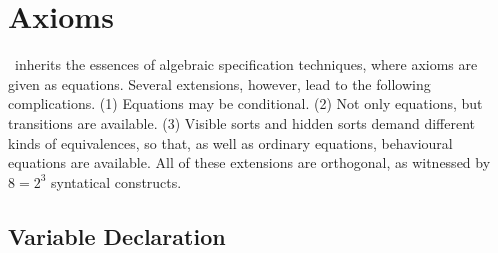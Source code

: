 \documentclass[a4paper]{memoir}
\begin{document}

\chapter{Axioms}\label{sec:p2-axioms}

\cafeobj~inherits the essences of algebraic specification techniques,
where axioms are given as equations. Several extensions, however,
lead to the following complications. (1) Equations may be conditional.
(2) Not only equations, but transitions are available.
(3) Visible sorts and hidden sorts demand different kinds of equivalences,
so that, as well as ordinary equations, behavioural equations are
available. All of these extensions are orthogonal, as witnessed by
$8 = 2^3$ syntatical constructs.

\section{Variable Declaration}\label{sec:p2-variable-decl}
\end{document}
